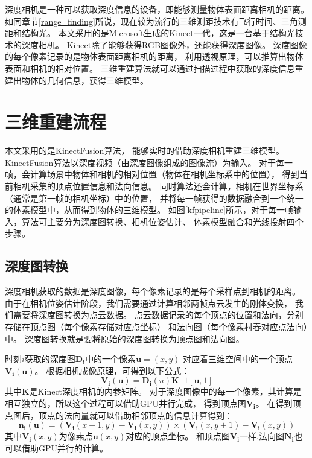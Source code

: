深度相机是一种可以获取深度信息的设备，即能够测量物体表面距离相机的距离。
如同章节\ref{range_finding}所说，现在较为流行的三维测距技术有飞行时间、三角测距和结构光。
本文采用的是Microsoft生成的Kinect一代，这是一台基于结构光技术的深度相机。
Kinect除了能够获得RGB图像外，还能获得深度图像。
深度图像的每个像素记录的是物体表面距离相机的距离，
利用透视原理，可以推算出物体表面和相机的相对位置。
三维重建算法就可以通过扫描过程中获取的深度信息重建出物体的几何信息，获得三维模型。

\section{三维重建流程}
本文采用的是KinectFusion算法\cite{izadi2011kinectfusion}，
能够实时的借助深度相机重建三维模型。
KinectFusion算法\cite{izadi2011kinectfusion}以深度视频（由深度图像组成的图像流）为输入。
对于每一帧，会计算场景中物体和相机的相对位置（物体在相机坐标系中的位置），
得到当前相机采集的顶点位置信息和法向信息。
同时算法还会计算，相机在世界坐标系（通常是第一帧的相机坐标）中的位置，
并将每一帧获得的数据融合到一个统一的体素模型中，从而得到物体的三维模型。
如图\ref{kfpipeline}所示，对于每一帧输入，算法可主要分为深度图转换、相机位姿估计、
体素模型融合和光线投射四个步骤。

\subsection{深度图转换}
深度相机获取的数据是深度图像，每个像素记录的是每个采样点到相机的距离。
由于在相机位姿估计阶段，我们需要通过计算相邻两帧点云发生的刚体变换，
我们需要将深度图转换为点云数据。
点云数据记录的每个顶点的位置和法向，分别存储在顶点图（每个像素存储对应点坐标）
和法向图（每个像素村春对应点法向）中。
深度图转换就是要将原始的深度图转换为顶点图和法向图。

时刻$i$获取的深度图$\bm{D_i}$中的一个像素$\bm{u}=(x,y)$
对应着三维空间中的一个顶点$\bm{V_i}(\bm{u})$。
根据相机成像原理，可得到以下公式：
\begin{equation}
    \label{eq_d2v}
    \bm{V_i(\bm{u})}=\bm{D_i}(u)\bm{K}^-1[\bm{\bm{u}},1]
\end{equation}
其中$\bm{K}$是Kinect深度相机的内参矩阵。
对于深度图像中的每一个像素，其计算是相互独立的，所以这个过程可以借助GPU并行完成，
得到顶点图$\bm{V_i}$。
在得到顶点图后，顶点的法向量就可以借助相邻顶点的信息计算得到：
\begin{equation}
    \bm{n_i}(\bm{u})=(\bm{V_i}(x+1,y)-\bm{V_i}(x,y))\times(\bm{V_i}(x,y+1)-\bm{V_i}(x,y))
\end{equation}
其中$\bm{V_i}(x,y)$为像素点$\bm{u}(x,y)$对应的顶点坐标。
和顶点图$\bm{V_i}$一样,法向图$\bm{N_i}$也可以借助GPU并行的计算。

